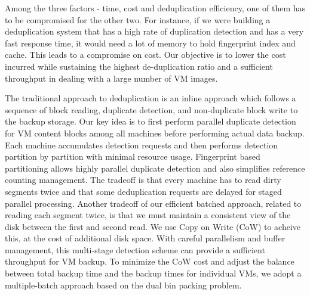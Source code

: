 Among the three factors - time, cost and deduplication efficiency, one of them has to be compromised for the other two. For instance, if we were building a deduplication system that has a high rate of duplication detection and has a very fast response time, 
it would need a lot of memory to hold fingerprint index and cache.  This leads to a compromise on cost. 
Our objective is to lower the cost incurred while sustaining the highest de-duplication ratio
and  a sufficient throughput in dealing with a large number of VM images.%

The traditional approach to  deduplication is an inline approach which follows
a sequence of block reading, duplicate detection,  and non-duplicate  block write to the 
backup storage.  
Our key idea  is to  first perform parallel duplicate detection for VM content blocks 
among all machines before performing actual data backup. Each machine
accumulates detection requests and  then performs detection   partition by partition 
with minimal resource usage.
Fingerprint based partitioning allows highly parallel duplicate detection  and also simplifies 
reference counting management.  
The tradeoff is that every machine has to read dirty segments twice
and that some deduplication requests are delayed for staged parallel processing.
Another tradeoff of our efficient batched approach, related to reading each
segment twice, is that we must maintain a consistent view of the disk between
the first and second read. We use Copy on Write (CoW) to acheive this, at the
cost of additional disk space.
With careful parallelism and buffer  management,
this multi-stage detection scheme can provide  a sufficient throughput for VM
backup. To minimize the CoW cost and adjust the balance between total backup
time and the backup times for individual VMs, we adopt a multiple-batch
approach based on the dual bin packing problem.



